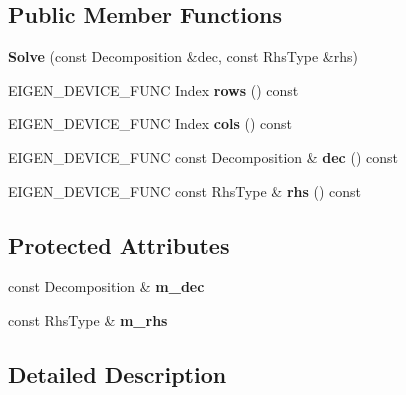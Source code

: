 \subsection*{Public Member Functions}
\begin{DoxyCompactItemize}
\item 
\mbox{\label{class_eigen_1_1_solve_ab2f77ff12f74adbc71d00e0ab94084c6}} 
{\bfseries Solve} (const Decomposition \&dec, const Rhs\+Type \&rhs)
\item 
\mbox{\label{class_eigen_1_1_solve_a424740b492bd186e324a63aecb79cc0c}} 
E\+I\+G\+E\+N\+\_\+\+D\+E\+V\+I\+C\+E\+\_\+\+F\+U\+NC Index {\bfseries rows} () const
\item 
\mbox{\label{class_eigen_1_1_solve_afab239630d010830af6623be2845ab38}} 
E\+I\+G\+E\+N\+\_\+\+D\+E\+V\+I\+C\+E\+\_\+\+F\+U\+NC Index {\bfseries cols} () const
\item 
\mbox{\label{class_eigen_1_1_solve_a9339834ec96d18577ba457a0482fd362}} 
E\+I\+G\+E\+N\+\_\+\+D\+E\+V\+I\+C\+E\+\_\+\+F\+U\+NC const Decomposition \& {\bfseries dec} () const
\item 
\mbox{\label{class_eigen_1_1_solve_ae0ee9346dcc5c4e2fcc843d9485d6f5a}} 
E\+I\+G\+E\+N\+\_\+\+D\+E\+V\+I\+C\+E\+\_\+\+F\+U\+NC const Rhs\+Type \& {\bfseries rhs} () const
\end{DoxyCompactItemize}
\subsection*{Protected Attributes}
\begin{DoxyCompactItemize}
\item 
\mbox{\label{class_eigen_1_1_solve_a91ef6f802270e6d770842cedb447cf7d}} 
const Decomposition \& {\bfseries m\+\_\+dec}
\item 
\mbox{\label{class_eigen_1_1_solve_a44ef175d27c8ac3d16306d943f541153}} 
const Rhs\+Type \& {\bfseries m\+\_\+rhs}
\end{DoxyCompactItemize}


\subsection{Detailed Description}
